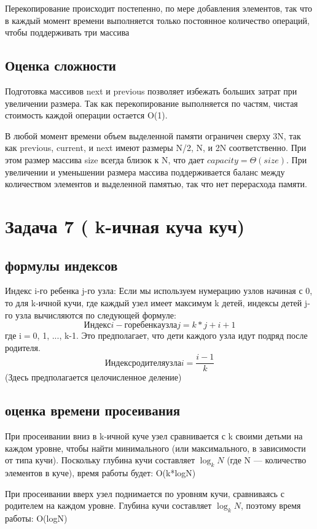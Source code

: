 \documentclass[a4paper,14pt]{article}
\begin{document}
Перекопирование происходит постепенно, по мере добавления элементов, так что в каждый момент времени выполняется только постоянное количество операций, чтобы поддерживать три массива


\subsection{Оценка сложности}
Подготовка массивов next и previous позволяет избежать больших затрат при увеличении размера. Так как перекопирование выполняется по частям, чистая стоимость каждой операции остается O(1).

В любой момент времени объем выделенной памяти ограничен сверху 3N, так как previous, current, и next имеют размеры N/2, N, и 2N соответственно. При этом размер массива size всегда близок к N, что дает $capacity = \Theta(size)$. При увеличении и уменьшении размера массива поддерживается баланс между количеством элементов и выделенной памятью, так что нет перерасхода памяти.


\section{Задача 7 ( k-ичная куча куч)}
\subsection{формулы индексов}
Индекс i-го ребенка j-го узла:
Если мы используем нумерацию узлов начиная с 0, то для k-ичной кучи, где каждый узел имеет максимум k детей, индексы детей j-го узла вычисляются по следующей формуле:
$$
Индекс i-го ребенка узла j = k * j + i + 1
$$
где i$ = $0, 1, ..., k-1. Это предполагает, что дети каждого узла идут подряд после родителя.
$$
Индекс родителя узла i = \frac{i - 1}{k}
$$
(Здесь предполагается целочисленное деление)

\subsection{оценка времени просеивания}
При просеивании вниз в k-ичной куче узел сравнивается с k своими детьми на каждом уровне, чтобы найти минимального (или максимального, в зависимости от типа кучи). Поскольку глубина кучи составляет $\log_k{N}$ (где N — количество элементов в куче), время работы будет: O(k*logN)

При просеивании вверх узел поднимается по уровням кучи, сравниваясь с родителем на каждом уровне. Глубина кучи составляет $\log_k{N}$, поэтому время работы: O(logN)
\end{document}
